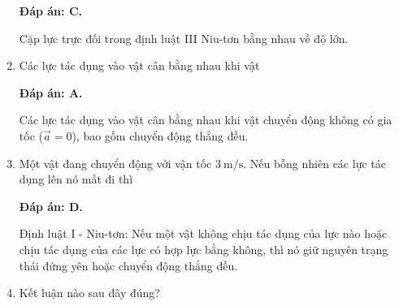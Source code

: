 \begin{enumerate}[label=\bfseries Câu \arabic*:]
	\loigiai
	{\textbf{Đáp án: C.}
		
		Cặp lực trực đối trong định luật III Niu-tơn bằng nhau về độ lớn.
		
		
	}
	\item {}
	
	\cauhoi
	{Các lực tác dụng vào vật cân bằng nhau khi vật
	}
	
	\loigiai
	{\textbf{Đáp án: A.}
		
		Các lực tác dụng vào vật cân bằng nhau khi vật chuyển động không có gia tốc ($\vec a = 0$), bao gồm chuyển động thẳng đều.
		
		
	}
	\item {}
	
	\cauhoi
	{Một vật đang chuyển động với vận tốc $3\ \text{m/s}$. Nếu bỗng nhiên các lực tác dụng lên nó mất đi thì
	}
	
	\loigiai
	{\textbf{Đáp án: D.}
		
		Định luật I - Niu-tơn: Nếu một vật không chịu tác dụng của lực nào hoặc chịu tác dụng của các lực có hợp lực bằng không, thì nó giữ nguyên trạng thái đứng yên hoặc chuyển động thẳng đều.
		
		
	}
	\item {}
	
	\cauhoi
	{Kết luận nào sau đây đúng?
	}
	

\end{enumerate}
